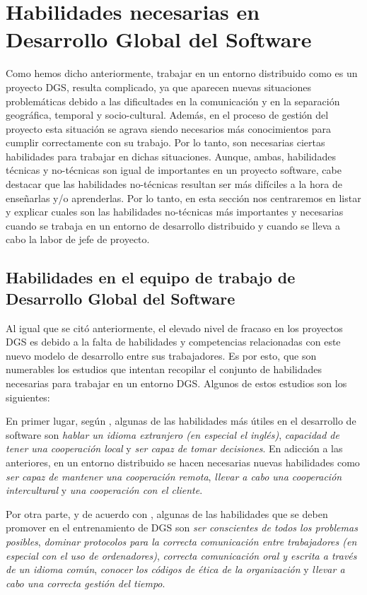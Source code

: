 \section{Habilidades necesarias en Desarrollo Global del Software}
\label{sec:HabilidadesDGS}

Como hemos dicho anteriormente, trabajar en un entorno distribuido como es un proyecto DGS, resulta complicado, ya que aparecen nuevas situaciones problemáticas debido a las dificultades en la comunicación y en la separación geográfica, temporal y socio-cultural. Además, en el proceso de gestión del proyecto esta situación se agrava siendo necesarios más conocimientos para cumplir correctamente con su trabajo. Por lo tanto, son necesarias ciertas habilidades para trabajar en dichas situaciones. Aunque, ambas, habilidades técnicas y no-técnicas son igual de importantes en un proyecto software, cabe destacar que las habilidades no-técnicas resultan ser más difíciles a la hora de enseñarlas y/o aprenderlas. Por lo tanto, en esta sección nos centraremos en listar y explicar cuales son las habilidades no-técnicas más importantes y necesarias cuando se trabaja en un entorno de desarrollo distribuido y cuando se lleva a cabo la labor de jefe de proyecto.

\subsection{Habilidades en el equipo de trabajo de Desarrollo Global del Software}
\label{sec:HabilidadesT}

Al igual que se citó anteriormente, el elevado nivel de fracaso en los proyectos DGS es debido a la falta de habilidades y competencias relacionadas con este nuevo modelo de desarrollo entre sus trabajadores. Es por esto, que son numerables los estudios que intentan recopilar el conjunto de habilidades necesarias para trabajar en un entorno DGS. Algunos de estos estudios son los siguientes:

En primer lugar, según \cite{bosnic2019assessing}, algunas de las habilidades más útiles en el desarrollo de software son \emph{hablar un idioma extranjero (en especial el inglés)}, \emph{capacidad de tener una cooperación local} y \emph{ser capaz de tomar decisiones}. En adicción a las anteriores, en un entorno distribuido se hacen necesarias nuevas habilidades como \emph{ser capaz de mantener una cooperación remota}, \emph{llevar a cabo una cooperación intercultural} y \emph{una cooperación con el cliente}.

Por otra parte, y de acuerdo con \cite{monasor2010training}, algunas de las habilidades que se deben promover en el entrenamiento de DGS son \emph{ser conscientes de todos los problemas posibles}, \emph{dominar protocolos para la correcta comunicación entre trabajadores (en especial con el uso de ordenadores)}, \emph{correcta comunicación oral y escrita a través de un idioma común}, \emph{conocer los códigos de ética de la organización} y \emph{llevar a cabo una correcta gestión del tiempo}.

